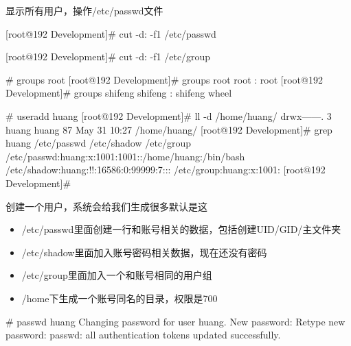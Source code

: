 
显示所有用户，操作/etc/passwd文件
\begin{Bash}[显示所有用户]

[root@192 Development]# cut -d: -f1 /etc/passwd

\end{Bash}


\begin{Bash}[用户组也是同样吧]

[root@192 Development]# cut -d: -f1 /etc/group

\end{Bash}

\begin{Bash}# groups
root
[root@192 Development]# groups root
root : root
[root@192 Development]# groups shifeng
shifeng : shifeng wheel
\end{Bash}

\begin{Bash}# useradd huang
[root@192 Development]# ll -d /home/huang/
drwx------. 3 huang huang 87 May 31 10:27 /home/huang/
[root@192 Development]# grep huang /etc/passwd /etc/shadow /etc/group
/etc/passwd:huang:x:1001:1001::/home/huang:/bin/bash
/etc/shadow:huang:!!:16586:0:99999:7:::
/etc/group:huang:x:1001:
[root@192 Development]# 
\end{Bash}
创建一个用户，系统会给我们生成很多默认是这
\begin{itemize}
\item /etc/passwd里面创建一行和账号相关的数据，包括创建UID/GID/主文件夹
\item /etc/shadow里面加入账号密码相关数据，现在还没有密码
\item /etc/group里面加入一个和账号相同的用户组
\item /home下生成一个账号同名的目录，权限是700
\end{itemize}

\begin{Bash}# passwd huang
Changing password for user huang.
New password: 
Retype new password: 
passwd: all authentication tokens updated successfully.
\end{Bash}


